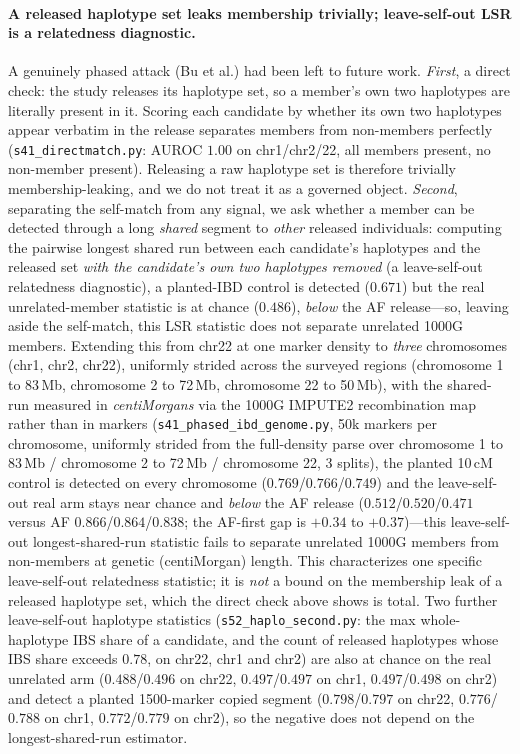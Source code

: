 \documentclass[11pt]{article}
\begin{document}
\paragraph{A released haplotype set leaks membership trivially; leave-self-out LSR is a relatedness diagnostic.}
A genuinely phased attack (Bu et al.) had been left to future work. \emph{First},
a direct check: the study releases its haplotype set, so a member's own two
haplotypes are literally present in it. Scoring each candidate by whether its own
two haplotypes appear verbatim in the release separates members from
non-members perfectly (\texttt{s41\_directmatch.py}: AUROC $1.00$ on chr1/chr2/22,
all members present, no non-member present). Releasing a raw haplotype set is
therefore trivially membership-leaking, and we do not treat it as a governed
object. \emph{Second}, separating the self-match from any signal, we ask whether a
member can
be detected through a long \emph{shared} segment to \emph{other} released
individuals: computing the pairwise longest shared run between each candidate's
haplotypes and the released set \emph{with the candidate's own two haplotypes
removed} (a leave-self-out relatedness diagnostic), a planted-IBD control is
detected ($0.671$) but the real unrelated-member statistic is at chance
($0.486$), \emph{below} the AF release---so, leaving aside the self-match, this
LSR statistic does not separate unrelated 1000G members. Extending this from
chr22 at one marker density to
\emph{three} chromosomes (chr1, chr2, chr22), uniformly strided across the
surveyed regions (chromosome 1 to 83\,Mb, chromosome 2 to 72\,Mb, chromosome 22
to 50\,Mb), with the
shared-run measured in \emph{centiMorgans} via the 1000G IMPUTE2 recombination
map rather than in markers (\texttt{s41\_phased\_ibd\_genome.py}, 50k markers per
chromosome, uniformly strided from the full-density parse over chromosome 1 to
83\,Mb / chromosome 2 to 72\,Mb / chromosome 22, 3 splits), the
planted 10\,cM control is detected
on every chromosome ($0.769$/$0.766$/$0.749$) and the leave-self-out real arm
stays near
chance and \emph{below} the AF release
($0.512$/$0.520$/$0.471$ versus AF $0.866$/$0.864$/$0.838$; the AF-first gap is
$+0.34$ to $+0.37$)---this
leave-self-out longest-shared-run statistic fails to separate unrelated 1000G
members from non-members at genetic (centiMorgan) length. This characterizes one
specific leave-self-out relatedness statistic; it is \emph{not} a bound on the
membership leak of a released haplotype set, which the direct check above shows
is total. Two further leave-self-out haplotype statistics
(\texttt{s52\_haplo\_second.py}: the max whole-haplotype IBS share of a candidate,
and the count of released haplotypes whose IBS share exceeds $0.78$, on chr22,
chr1 and chr2) are also at chance on the real unrelated arm
($0.488$/$0.496$ on chr22, $0.497$/$0.497$ on chr1, $0.497$/$0.498$ on chr2) and
detect a planted
1500-marker copied segment ($0.798$/$0.797$ on chr22, $0.776$/$0.788$ on chr1,
$0.772$/$0.779$ on chr2),
so the negative does not depend on the longest-shared-run estimator.
\end{document}
